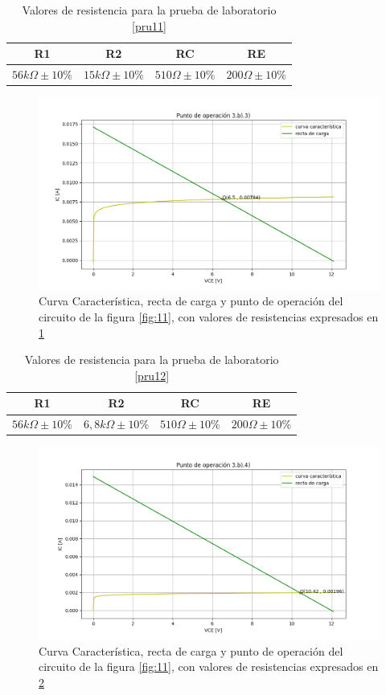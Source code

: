\documentclass[10pt, a4paper]{article}
\begin{document}
    \newpage

    \begin{table}[h!]
        \centering
        \caption{Valores de resistencia para la prueba de laboratorio \ref{pru11}}
        \label{tab:3b3}
        \begin{tabular}{|c|c|c|c|} \hline
            R1 & R2 & RC & RE \\ \hline
            $56k\Omega \pm 10\%$ & $15k\Omega \pm 10\%$ & $510\Omega \pm 10\%$ & $200\Omega \pm 10\%$ \\ \hline
        \end{tabular}
    \end{table}

    \begin{figure}[h!]
        \centering
        \includegraphics[height=5cm\textwidth]{3b3.png}
        \caption{Curva Característica, recta de carga y punto de operación del circuito de la figura \ref{fig:11}, con valores de resistencias expresados en \ref{tab:3b3}}
        \label{fig:3b3}
    \end{figure}

    \begin{table}[h!]
        \centering
        \caption{Valores de resistencia para la prueba de laboratorio \ref{pru12}}
        \label{tab:3b4}
        \begin{tabular}{|c|c|c|c|} \hline
            R1 & R2 & RC & RE \\ \hline
            $56k\Omega \pm 10\%$ & $6,8k\Omega \pm 10\%$ & $510\Omega \pm 10\%$ & $200\Omega \pm 10\%$ \\ \hline
        \end{tabular}
    \end{table}

    \begin{figure}[h!]
        \centering
        \includegraphics[height=5cm\textwidth]{3b4.png}
        \caption{Curva Característica, recta de carga y punto de operación del circuito de la figura \ref{fig:11}, con valores de resistencias expresados en \ref{tab:3b4}}
        \label{fig:3b4}
    \end{figure}
\end{document}
